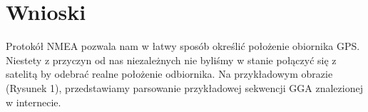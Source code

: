 \documentclass[wide,a4paper,titlepage,12pt] {article}
\begin{document}
\section{Wnioski}
Protokół NMEA pozwala nam w łatwy sposób określić położenie obiornika GPS. Niestety z przyczyn od nas niezależnych nie byliśmy w stanie połączyć się z satelitą by odebrać realne położenie odbiornika. Na przykładowym obrazie (Rysunek 1), przedstawiamy parsowanie przykładowej sekwencji GGA znalezionej w internecie.
\end{document}
